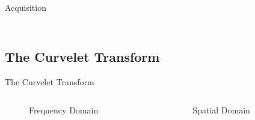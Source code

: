 \documentclass[mathserif]{beamer}
\begin{document}
\begin{frame}{Acquisition}
\begin{columns}[T]
\begin{column}{0.5\textwidth}
{            }
        \end{column}
    \end{columns}
\end{frame}

\subsection{The Curvelet Transform}
\begin{frame}{The Curvelet Transform}
    \begin{columns}
        \begin{column}{.5\textwidth}
            \begin{figure}
                
                \caption{Frequency Domain}
            \end{figure}
        \end{column}
        \begin{column}{.5\textwidth}
            \begin{figure}
                
                \caption{Spatial Domain}
            \end{figure}
        \end{column}
    \end{columns}
\end{frame}
\end{document}
